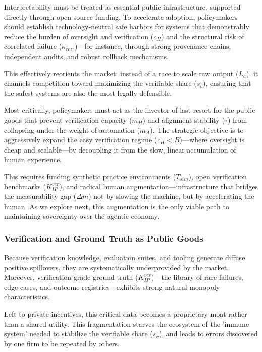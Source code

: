 \documentclass[12pt, letter]{article}
\begin{document}
Interpretability must be treated as essential public infrastructure, supported directly through open-source funding. To accelerate adoption, policymakers should establish technology-neutral safe harbors for systems that demonstrably reduce the burden of oversight and verification ($c_H$) and the structural risk of correlated failure ($\kappa_{\mathrm{corr}}$)—for instance, through strong provenance chains, independent audits, and robust rollback mechanisms. 

This effectively reorients the market: instead of a race to scale raw output ($L_a$), it channels competition toward maximizing the verifiable share ($s_v$), ensuring that the safest systems are also the most legally defensible.

Most critically, policymakers must act as the investor of last resort for the public goods that prevent verification capacity ($m_H$) and alignment stability ($\tau$) from collapsing under the weight of automation ($m_A$). The strategic objective is to aggressively expand the easy verification regime ($c_H < B$)—where oversight is cheap and scalable—by decoupling it from the slow, linear accumulation of human experience.

This requires funding synthetic practice environments ($T_{sim}$), open verification benchmarks ($K_{IP}^{ver}$), and radical human augmentation—infrastructure that bridges the measurability gap ($\Delta m$) not by slowing the machine, but by accelerating the human. As we explore next, this augmentation is the only viable path to maintaining sovereignty over the agentic economy.

\subsubsection{Verification and Ground Truth as Public Goods}
Because verification knowledge, evaluation suites, and tooling generate diffuse positive spillovers, they are systematically underprovided by the market. Moreover, verification-grade ground truth ($K_{IP}^{ver}$)—the library of rare failures, edge cases, and outcome registries—exhibits strong natural monopoly characteristics.

Left to private incentives, this critical data becomes a proprietary moat rather than a shared utility. This fragmentation starves the ecosystem of the 'immune system' needed to stabilize the verifiable share ($s_v$), and leads to errors discovered by one firm to be repeated by others.
\end{document}
